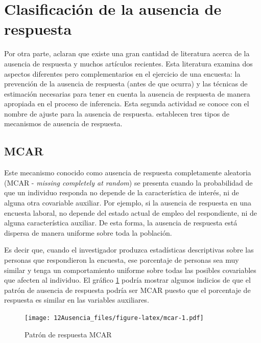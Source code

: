 \documentclass[
  12pt,
  spanish,
]{book}
\begin{document}
\hypertarget{clasificaciuxf3n-de-la-ausencia-de-respuesta}{%
\section{Clasificación de la ausencia de respuesta}\label{clasificaciuxf3n-de-la-ausencia-de-respuesta}}

Por otra parte, \citet{Lund} aclaran que existe una gran cantidad de literatura acerca de la ausencia de respuesta y muchos artículos recientes. Esta literatura examina dos aspectos diferentes pero complementarios en el ejercicio de una encuesta: la prevención de la ausencia de respuesta (antes de que ocurra) y las técnicas de estimación necesarias para tener en cuenta la ausencia de respuesta de manera apropiada en el proceso de inferencia. Esta segunda actividad se conoce con el nombre de ajuste para la ausencia de respuesta. \citet{LR2002} establecen tres tipos de mecanismos de ausencia de respuesta.

\hypertarget{mcar}{%
\subsection{MCAR}\label{mcar}}

Este mecanismo conocido como ausencia de respuesta completamente aleatoria (MCAR - \emph{missing completely at random}) se presenta cuando la probabilidad de que un individuo responda no depende de la característica de interés, ni de alguna otra covariable auxiliar. Por ejemplo, si la ausencia de respuesta en una encuesta laboral, no depende del estado actual de empleo del respondiente, ni de alguna característica auxiliar. De esta forma, la ausencia de respuesta está dispersa de manera uniforme sobre toda la población.

Es decir que, cuando el investigador produzca estadísticas descriptivas sobre las personas que respondieron la encuesta, ese porcentaje de personas sea muy similar y tenga un comportamiento uniforme sobre todas las posibles covariables que afecten al individuo. El gráfico \ref{fig:mcar} podría mostrar algunos indicios de que el patrón de ausencia de respuesta podría ser MCAR puesto que el porcentaje de respuesta es similar en las variables auxiliares.

\begin{figure}
\centering
\texttt{[image: 12Ausencia\_files/figure-latex/mcar-1.pdf]}
\caption{\label{fig:mcar}Patrón de respuesta MCAR}
\end{figure}
\end{document}
